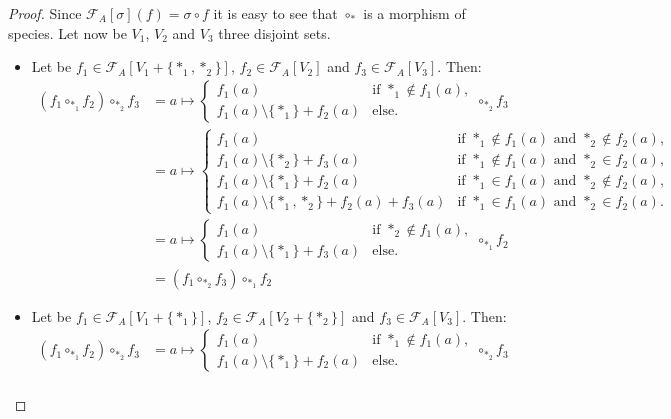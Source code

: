 \documentclass[a4paper]{article}
\theoremstyle{definition}
\begin{document}
\begin{proof}
Since $\mathcal{F}_A[\sigma](f) = \sigma\circ f$ it is easy to see that $\circ_{\ast}$ is a morphism of species. Let now be $V_1$, $V_2$ and $V_3$ three disjoint sets.
\begin{itemize}
\item Let be $f_1\in\mathcal{F}_A[V_1+\{\ast_1,\ast_2\}]$, $f_2\in \mathcal{F}_A[V_2]$ and $f_3\in \mathcal{F}_A[V_3]$. Then:
\begin{align*}
(f_1\circ_{\ast_1} f_2)\circ_{\ast_2} f_3 &= a\mapsto\left\{\begin{array}{cl}
f_1(a)  & \text{if $\ast_1\not\in f_1(a)$},    \\ 
f_1(a)\setminus\{\ast_1\} + f_2(a)  & \text{else.}\end{array}\right. \circ_{\ast_2} f_3 \\
&= a\mapsto\left\{\begin{array}{cl}
f_1(a)  & \text{if $\ast_1\not\in f_1(a)$ and $\ast_2\not\in f_2(a)$},    \\
f_1(a)\setminus\{\ast_2\} + f_3(a)  & \text{if $\ast_1\not\in f_1(a)$ and $\ast_2\in f_2(a)$},    \\ 
f_1(a)\setminus\{\ast_1\} + f_2(a)  & \text{if $\ast_1\in f_1(a)$ and $\ast_2\not\in f_2(a)$},    \\ 
f_1(a)\setminus\{\ast_1,\ast_2\} + f_2(a) + f_3(a)  & \text{if $\ast_1\in f_1(a)$ and $\ast_2\in f_2(a)$}.\end{array}\right. \\
&= a\mapsto\left\{\begin{array}{cl}
f_1(a)  & \text{if $\ast_2\not\in f_1(a)$},    \\ 
f_1(a)\setminus\{\ast_1\} + f_3(a)  & \text{else.}\end{array}\right. \circ_{\ast_1} f_2 \\
&= (f_1\circ_{\ast_2} f_3)\circ_{\ast_1} f_2
\end{align*}
\item Let be $f_1\in\mathcal{F}_A[V_1+\{\ast_1\}]$, $f_2\in \mathcal{F}_A[V_2+\{\ast_2\}]$ and $f_3\in \mathcal{F}_A[V_3]$. Then:
\begin{align*}
(f_1\circ_{\ast_1} f_2)\circ_{\ast_2} f_3 &= a\mapsto\left\{\begin{array}{cl}
f_1(a)  & \text{if $\ast_1\not\in f_1(a)$},    \\ 
f_1(a)\setminus\{\ast_1\} + f_2(a)  & \text{else.}\end{array}\right. \circ_{\ast_2} f_3 \\

\end{align*}
\end{itemize}
\end{proof}
\end{document}
